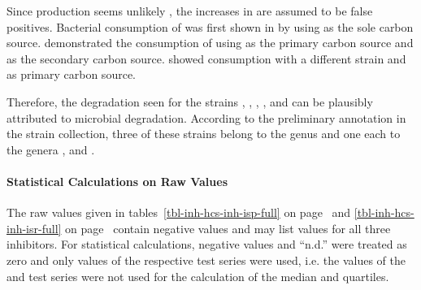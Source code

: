 Since \laev{} production seems unlikely \cite{Sauer2008}, the increases in \laev{} are assumed to be false positives. Bacterial consumption of \laev{} was first shown in \citeyear{Harada1969} by \textcite{Harada1969} using \laev{} as the sole carbon source. \textcite{Jang1996} demonstrated the consumption of \laev{} using \glc{} as the primary carbon source and \laev{} as the secondary carbon source. \textcite{Keenan2004} showed \laev{} consumption with a different strain and \xyl{} as primary carbon source.

Therefore, the \laev{} degradation seen for the strains , , , ,  and  can be plausibly attributed to microbial degradation. According to the preliminary annotation in the strain collection, three of these strains belong to the genus  and one each to the genera ,  and .

\paragraph{Statistical Calculations on Raw Values}
The raw values given in tables~\ref{tbl-inh-hcs-inh-isp-full} on page~\pageref{tbl-inh-hcs-inh-isp-full} and \ref{tbl-inh-hcs-inh-isr-full} on page~\pageref{tbl-inh-hcs-inh-isr-full} contain negative values and may list values for all three inhibitors. For statistical calculations, negative values and \enquote{n.d.} were treated as zero and only values of the respective test series were used, i.e. the \van{} values of the \fur{} and \hmf{} test series were not used for the calculation of the \van{} median and quartiles.

